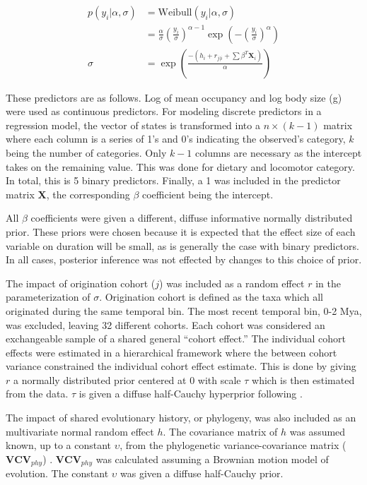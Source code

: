 \documentclass[12pt,letterpaper]{article}
\begin{document}
\begin{align}
  p(y_{i}|\alpha, \sigma) &= \mathrm{Weibull}(y_{i}|\alpha, \sigma) \nonumber \\ 
  &= \frac{\alpha}{\sigma} \left(\frac{y_{i}}{\sigma}\right)^{\alpha - 1} \exp\left(-\left(\frac{y_{i}}{\sigma}\right)^{\alpha}\right) \label{eq:weibull}\\
  \sigma &= \exp\left(\frac{-(h_{i} + r_{j | i} + \sum \beta^{T} \mathbf{X}_{i})}{\alpha}\right) \label{eq:reg}
\end{align}

These predictors are as follows. Log of mean occupancy and log body size (g) were used as continuous predictors. For modeling discrete predictors in a regression model, the vector of states is transformed into a \(n \times (k - 1)\) matrix where each column is a series of 1's and 0's indicating the observed's category, \(k\) being the number of categories. Only \(k - 1\) columns are necessary as the intercept takes on the remaining value. This was done for dietary and locomotor category. In total, this is 5 binary predictors. Finally, a 1 was included in the predictor matrix \(\mathbf{X}\), the corresponding \(\beta\) coefficient being the intercept.

All \(\beta\) coefficients were given a different, diffuse informative normally distributed prior. These priors were chosen because it is expected that the effect size of each variable on duration will be small, as is generally the case with binary predictors. In all cases, posterior inference was not effected by changes to this choice of prior.

The impact of origination cohort (\(j\)) was included as a random effect \(r\) in the parameterization of \(\sigma\). Origination cohort is defined as the taxa which all originated during the same temporal bin. The most recent temporal bin, 0-2 Mya, was excluded, leaving 32 different cohorts. Each cohort was considered an exchangeable sample of a shared general ``cohort effect.'' The individual cohort effects were estimated in a hierarchical framework where the between cohort variance constrained the individual cohort effect estimate. This is done by giving \(r\) a normally distributed prior centered at 0 with scale \(\tau\) which is then estimated from the data. \(\tau\) is given a diffuse half-Cauchy hyperprior following \citet{Gelman2006a}.

The impact of shared evolutionary history, or phylogeny, was also included as an multivariate normal random effect \(h\). The covariance matrix of \(h\) was assumed known, up to a constant \(\upsilon\), from the phylogenetic variance-covariance matrix (\(\mathbf{VCV}_{phy}\)) \citep{Lynch1991,Housworth2004}. \(\mathbf{VCV}_{phy}\) was calculated assuming a Brownian motion model of evolution. The constant \(\upsilon\) was given a diffuse half-Cauchy prior.
\end{document}
